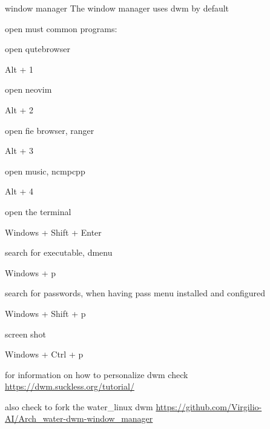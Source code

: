 \begin{section}{window manager}
	The window manager uses dwm by default

	open must common programs:

	open qutebrowser

	Alt + 1

	open neovim

	Alt + 2

	open fie browser, ranger

	Alt + 3

	open music, ncmpcpp

	Alt + 4

	open the terminal

	Windows + Shift + Enter

	search for executable, dmenu

	Windows + p

	search for passwords, when having pass menu installed and configured

	Windows + Shift + p

	screen shot

	Windows + Ctrl + p

	for information on how to personalize dwm check \url{https://dwm.suckless.org/tutorial/}

	also check to fork the water_linux dwm \url{https://github.com/Virgilio-AI/Arch_water-dwm-window_manager}

\end{section}
